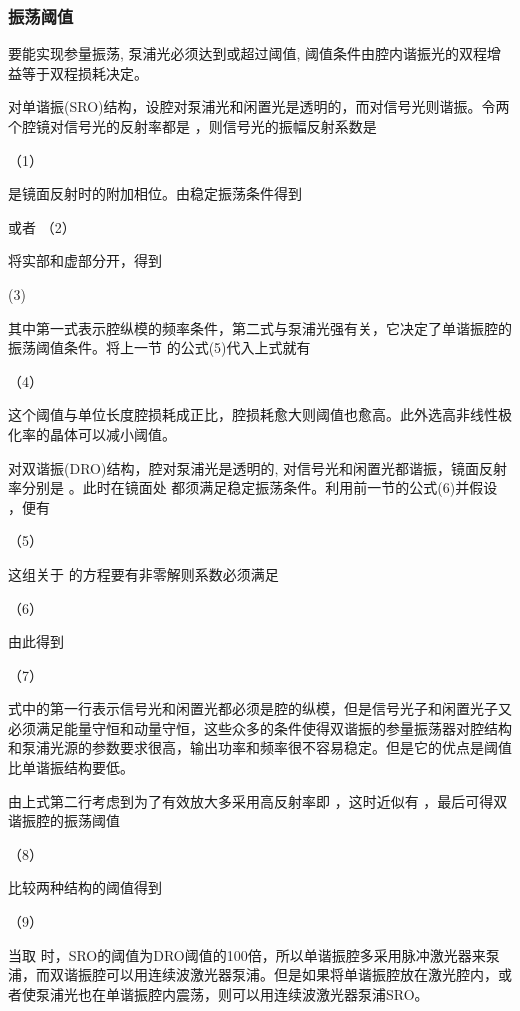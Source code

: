 \subsubsection{振荡阈值}

要能实现参量振荡, 泵浦光必须达到或超过阈值, 阈值条件由腔内谐振光的双程增益等于双程损耗决定。

对单谐振(SRO)结构，设腔对泵浦光和闲置光是透明的，而对信号光则谐振。令两个腔镜对信号光的反射率都是 ，则信号光的振幅反射系数是

                                               （1）

 是镜面反射时的附加相位。由稳定振荡条件得到

 
或者                                         （2）

将实部和虚部分开，得到

                             (3)

其中第一式表示腔纵模的频率条件，第二式与泵浦光强有关，它决定了单谐振腔的振荡阈值条件。将上一节 的公式(5)代入上式就有

                             （4）              

这个阈值与单位长度腔损耗成正比，腔损耗愈大则阈值也愈高。此外选高非线性极化率的晶体可以减小阈值。

对双谐振(DRO)结构，腔对泵浦光是透明的, 对信号光和闲置光都谐振，镜面反射率分别是 。此时在镜面处 都须满足稳定振荡条件。利用前一节的公式(6)并假设 ，便有

              （5）                     

这组关于 的方程要有非零解则系数必须满足

   （6）  

由此得到

        （7）         

式中的第一行表示信号光和闲置光都必须是腔的纵模，但是信号光子和闲置光子又必须满足能量守恒和动量守恒，这些众多的条件使得双谐振的参量振荡器对腔结构和泵浦光源的参数要求很高，输出功率和频率很不容易稳定。但是它的优点是阈值比单谐振结构要低。

由上式第二行考虑到为了有效放大多采用高反射率即 ，这时近似有 ，最后可得双谐振腔的振荡阈值

                   （8）      

比较两种结构的阈值得到

                             （9）      

当取 时，SRO的阈值为DRO阈值的100倍，所以单谐振腔多采用脉冲激光器来泵浦，而双谐振腔可以用连续波激光器泵浦。但是如果将单谐振腔放在激光腔内，或者使泵浦光也在单谐振腔内震荡，则可以用连续波激光器泵浦SRO。

